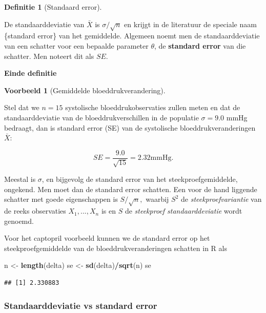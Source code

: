 \documentclass[
  12pt,dutch]{book}
\newenvironment{Shaded}{\begin{snugshade}}{\end{snugshade}}
\newcommand{\FunctionTok}[1]{\textcolor[rgb]{0.13,0.29,0.53}{\textbf{#1}}}
\newcommand{\NormalTok}[1]{#1}
\newcommand{\OtherTok}[1]{\textcolor[rgb]{0.56,0.35,0.01}{#1}}
\newcommand{\SpecialCharTok}[1]{\textcolor[rgb]{0.81,0.36,0.00}{\textbf{#1}}}
\theoremstyle{definition}
\newtheorem{definition}{Definitie}[chapter]
\theoremstyle{definition}
\newtheorem{example}{Voorbeeld}[chapter]
\theoremstyle{definition}
\theoremstyle{definition}
\theoremstyle{remark}
\begin{document}
\begin{definition}[Standaard error]
\protect\hypertarget{def:unnamed-chunk-130}{}\label{def:unnamed-chunk-130}~
\end{definition}

De standaarddeviatie van \(\bar{X}\) is \(\sigma/\sqrt{n}\) en krijgt in de literatuur de speciale naam \{standard error\} van
het gemiddelde. Algemeen noemt men de standaarddeviatie van een schatter
voor een bepaalde parameter \(\theta\), de \textbf{standard error} van die
schatter. Men noteert dit als \(SE\).

\textbf{Einde definitie}

\begin{example}[Gemiddelde bloeddrukverandering]
\protect\hypertarget{exm:unnamed-chunk-131}{}\label{exm:unnamed-chunk-131}~
\end{example}

Stel dat we \(n = 15\) systolische bloeddrukobservaties zullen meten en dat de standaarddeviatie van de bloeddrukverschillen in de populatie \(\sigma = 9.0\) mmHg bedraagt, dan is standard error (SE) van de systolische bloeddrukveranderingen \(\bar X\):

\[
SE= \frac{9.0}{\sqrt{15}}=2.32\text{mmHg.}
\]

Meestal is \(\sigma\), en bijgevolg de standard error van het
steekproefgemiddelde, ongekend. Men moet dan de standard error schatten.
Een voor de hand liggende schatter met goede eigenschappen is \(S/\sqrt{n},\)
waarbij \(S^2\) de \emph{steekproefvariantie} van de reeks observaties \(X_1,...,X_n\) is en \(S\) de \emph{steekproef standaarddeviatie} wordt genoemd.

Voor het captopril voorbeeld kunnen we de standard error op het steekproefgemiddelde van de bloeddrukveranderingen schatten in R als

\begin{Shaded}
\begin{Highlighting}[]
\NormalTok{n }\OtherTok{\textless{}{-}} \FunctionTok{length}\NormalTok{(delta)}
\NormalTok{se }\OtherTok{\textless{}{-}} \FunctionTok{sd}\NormalTok{(delta)}\SpecialCharTok{/}\FunctionTok{sqrt}\NormalTok{(n)}
\NormalTok{se}
\end{Highlighting}
\end{Shaded}

\begin{verbatim}
## [1] 2.330883
\end{verbatim}

\subsubsection{Standaarddeviatie vs standard error}\label{standaarddeviatie-vs-standard-error}
\end{document}
